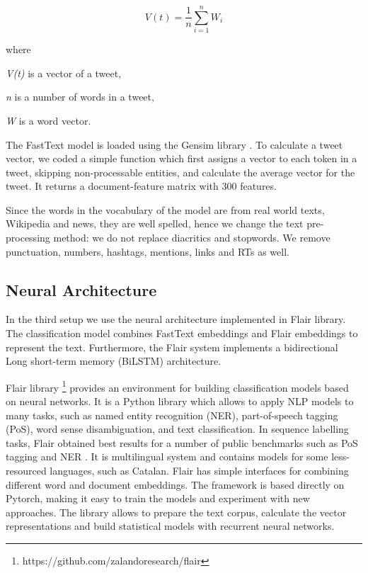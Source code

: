 \documentclass[10pt, a4paper]{article}
\begin{document}
\[V(t)=\frac{1}{n}\sum_{i=1}^{n}W_{i}\]

where 

\textit{V(t)} is a vector of a tweet, 

\textit{n} is a number of words in a tweet, 

\textit{W} is a word vector. 

The FastText model is loaded using the Gensim library \cite{rehurek_lrec}. To calculate a tweet vector, we coded a simple function which first assigns a vector to each token in a tweet, skipping non-processable entities, and calculate the average vector for the tweet. It returns a document-feature matrix with 300 features. 

Since the words in the vocabulary of the model are from real world texts, Wikipedia and news, they are well spelled, hence we change the text pre-processing method: we do not replace diacritics and stopwords. We remove punctuation, numbers, hashtags, mentions, links and RTs as well. 



\subsection{Neural Architecture}

In the third setup we use the neural architecture implemented in Flair library. The classification model combines FastText embeddings and Flair embeddings to represent the text. Furthermore, the Flair system implements a bidirectional Long short-term memory (BiLSTM) architecture.

Flair library \footnote{https://github.com/zalandoresearch/flair} provides an environment for building classification models based on neural networks. It is a Python library which allows to apply NLP models to many tasks, such as named entity recognition (NER), part-of-speech tagging (PoS), word sense disambiguation, and text classification. In sequence labelling tasks, Flair obtained best results for a number of public benchmarks such as PoS tagging and NER \cite{akbik-etal-2018-contextual}. It is multilingual system and contains models for some less-resourced languages, such as Catalan. Flair has simple interfaces for combining different word and document embeddings. The framework is based directly on Pytorch, making it easy to train the models and experiment with new approaches. The library allows to prepare the text corpus, calculate the vector representations and build statistical models with recurrent neural networks. 
\end{document}
